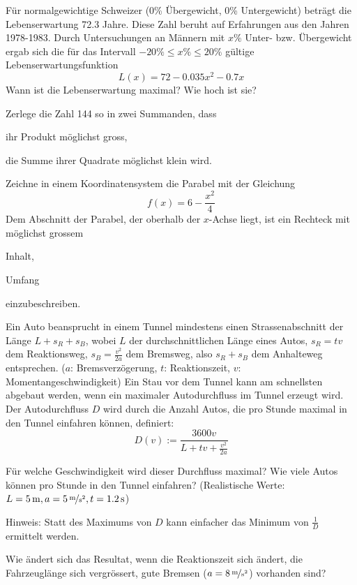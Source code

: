 \documentclass[%
11pt,%
twoside,%
titlepage,%
german,%
headsepline%
]{scrartcl}
\begin{document}
\begin{ueb}[Normgewicht]
F\"ur normalgewichtige Schweizer (0\% \"Ubergewicht, 0\% Untergewicht) betr\"agt die Lebenserwartung 72.3 Jahre. Diese Zahl beruht auf Erfahrungen aus den Jahren 1978-1983. Durch Untersuchungen an M\"annern mit $x\%$ Unter- bzw. \"Ubergewicht ergab sich die f\"ur das Intervall $-20\%\leq x\% \leq 20\%$ g\"ultige Lebenserwartungsfunktion
$$L(x)=72-0.035x^2-0.7x$$
Wann ist die Lebenserwartung maximal? Wie hoch ist sie?
\end{ueb}

\begin{ueb}[zerlegen]
Zerlege die Zahl 144 so in zwei Summanden, dass
\begin{enumeratea}
\item ihr Produkt m\"oglichst gross,
\item die Summe ihrer Quadrate m\"oglichst klein wird.
\end{enumeratea}
\end{ueb}

\begin{ueb}[Parabel]
Zeichne in einem Koordinatensystem die Parabel mit der Gleichung
$$f(x) = 6 - \frac{x^2}{4}$$
Dem Abschnitt der Parabel, der oberhalb der $x$-Achse liegt, ist ein Rechteck mit m\"oglichst grossem
\begin{enumeratea}
\item Inhalt,
\item Umfang
\end{enumeratea}
einzubeschreiben.
\end{ueb}

\begin{ueb}[Stau]
Ein Auto beansprucht in einem Tunnel mindestens einen Strassenabschnitt der L\"ange $L+s_R+s_B$, wobei $L$ der durchschnittlichen L\"ange eines Autos, $s_R=tv$ dem Reaktionsweg, $s_B=\frac{v^2}{2a}$ dem Bremsweg, also $s_R+s_B$ dem Anhalteweg entsprechen. ($a$: Bremsverz\"ogerung, $t$: Reaktionszeit, $v$: Momentangeschwindigkeit)
Ein Stau vor dem Tunnel kann am schnellsten abgebaut werden, wenn ein maximaler Autodurchfluss im Tunnel erzeugt wird. Der Autodurchfluss $D$ wird durch die Anzahl Autos, die pro Stunde maximal in den Tunnel einfahren k\"onnen, definiert:
$$D(v):=\frac{3600v}{L+tv+\frac{v^2}{2a}}$$
\begin{enumeratea}
\item F\"ur welche Geschwindigkeit wird dieser Durchfluss maximal? Wie viele Autos k\"onnen pro Stunde in den Tunnel einfahren? (Realistische Werte: $L=\unit[5]{m}, a=\unitfrac[5]{m}{s^2}, t=\unit[1.2]{s}$)

{\small Hinweis: Statt des Maximums von $D$ kann einfacher das Minimum von $\frac{1}{D}$ ermittelt werden.}
\item Wie \"andert sich das Resultat, wenn die Reaktionszeit sich \"andert, die Fahrzeugl\"ange sich vergr\"ossert, gute Bremsen ($a=\unitfrac[8]{m}{s^2}$) vorhanden sind?
\end{enumeratea}
\end{ueb}
\end{document}

